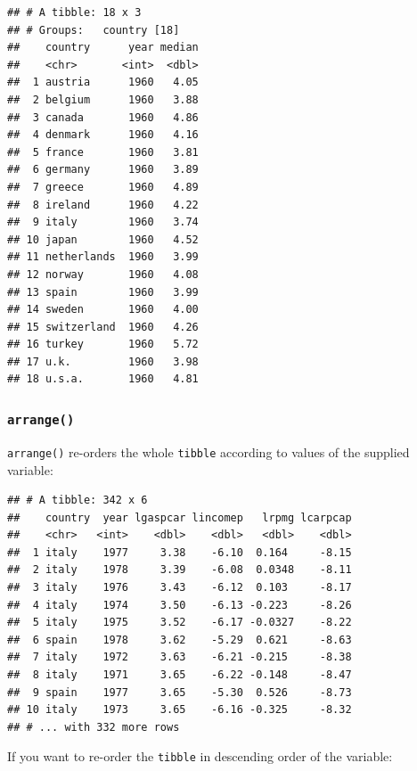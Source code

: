 \documentclass[]{gitbook}
\newenvironment{Shaded}{\begin{snugshade}}{\end{snugshade}}
\newcommand{\KeywordTok}[1]{\textcolor[rgb]{0.13,0.29,0.53}{\textbf{#1}}}
\newcommand{\NormalTok}[1]{#1}
\newcommand{\OperatorTok}[1]{\textcolor[rgb]{0.81,0.36,0.00}{\textbf{#1}}}
\newcommand{\StringTok}[1]{\textcolor[rgb]{0.31,0.60,0.02}{#1}}
\theoremstyle{definition}
\theoremstyle{definition}
\theoremstyle{definition}
\theoremstyle{remark}
\begin{document}
\begin{verbatim}
## # A tibble: 18 x 3
## # Groups:   country [18]
##    country      year median
##    <chr>       <int>  <dbl>
##  1 austria      1960   4.05
##  2 belgium      1960   3.88
##  3 canada       1960   4.86
##  4 denmark      1960   4.16
##  5 france       1960   3.81
##  6 germany      1960   3.89
##  7 greece       1960   4.89
##  8 ireland      1960   4.22
##  9 italy        1960   3.74
## 10 japan        1960   4.52
## 11 netherlands  1960   3.99
## 12 norway       1960   4.08
## 13 spain        1960   3.99
## 14 sweden       1960   4.00
## 15 switzerland  1960   4.26
## 16 turkey       1960   5.72
## 17 u.k.         1960   3.98
## 18 u.s.a.       1960   4.81
\end{verbatim}

\hypertarget{arrange}{%
\subsubsection{\texorpdfstring{\texttt{arrange()}}{arrange()}}\label{arrange}}

\texttt{arrange()} re-orders the whole \texttt{tibble} according to
values of the supplied variable:

\begin{Shaded}
\end{Shaded}

\begin{verbatim}
## # A tibble: 342 x 6
##    country  year lgaspcar lincomep   lrpmg lcarpcap
##    <chr>   <int>    <dbl>    <dbl>   <dbl>    <dbl>
##  1 italy    1977     3.38    -6.10  0.164     -8.15
##  2 italy    1978     3.39    -6.08  0.0348    -8.11
##  3 italy    1976     3.43    -6.12  0.103     -8.17
##  4 italy    1974     3.50    -6.13 -0.223     -8.26
##  5 italy    1975     3.52    -6.17 -0.0327    -8.22
##  6 spain    1978     3.62    -5.29  0.621     -8.63
##  7 italy    1972     3.63    -6.21 -0.215     -8.38
##  8 italy    1971     3.65    -6.22 -0.148     -8.47
##  9 spain    1977     3.65    -5.30  0.526     -8.73
## 10 italy    1973     3.65    -6.16 -0.325     -8.32
## # ... with 332 more rows
\end{verbatim}

If you want to re-order the \texttt{tibble} in descending order of the
variable:
\end{document}
